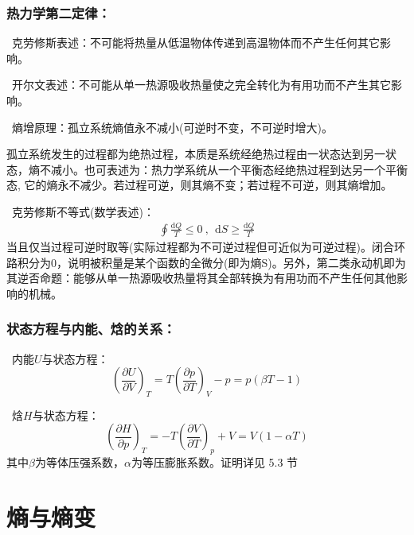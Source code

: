 \documentclass[zihao=5,UTF8]{report}
\begin{document}
\subsubsection{热力学第二定律：}
\ 克劳修斯表述：不可能将热量从低温物体传递到高温物体而不产生任何其它影响。\par
{}\ 开尔文表述：不可能从单一热源吸收热量使之完全转化为有用功而不产生其它影响。\par
{}\ 熵增原理：孤立系统熵值永不减小(可逆时不变，不可逆时增大)。\par
{\par\color{gray}\small
孤立系统发生的过程都为绝热过程，本质是系统经绝热过程由一状态达到另一状态，熵不减小。也可表述为：热力学系统从一个平衡态经绝热过程到达另一个平衡态, 它的熵永不减少。若过程可逆，则其熵不变；若过程不可逆，则其熵增加。
\par}

\ 克劳修斯不等式(数学表述)：
\begin{gather}
    \oint \frac{\mathrm{d}Q}{\, T\, } \le 0\ ,\ \ 
    \mathrm{d}S \ge \frac{\mathrm{d}Q}{T}
\end{gather}
{\color{gray}\small 当且仅当过程可逆时取等(实际过程都为不可逆过程但可近似为可逆过程)。闭合环路积分为0，说明被积量是某个函数的全微分(即为熵S)。另外，第二类永动机即为其逆否命题：能够从单一热源吸收热量将其全部转换为有用功而不产生任何其他影响的机械。}

\subsubsection{状态方程与内能、焓的关系：}
\ 内能$U$与状态方程：
\begin{equation}
    \left(\frac{\partial U}{\partial V} \right)_T = T \left(\frac{\partial p}{\partial T}\right)_V - p =p\left(\beta T -1\right)
\end{equation}
\par
{}\ 焓$H$与状态方程：
\begin{equation}
    \left(\frac{\partial H}{\partial p} \right)_T = -T \left(\frac{\partial V}{\partial T}\right)_p + V = V\left( 1- \alpha T\right)
\end{equation}
{\color{gray}\small 其中$\beta$为等体压强系数，$\alpha $为等压膨胀系数。证明详见 5.3 节}
\section{熵与熵变}
\end{document}
